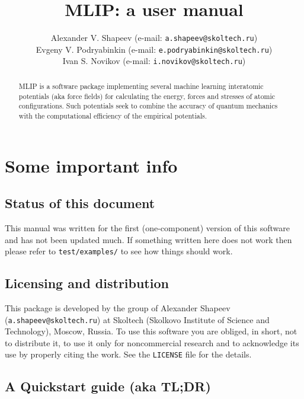 \documentclass[12pt]{article}
\author{Alexander V. Shapeev (e-mail: \texttt{a.shapeev@skoltech.ru})
\\
Evgeny V. Podryabinkin (e-mail: \texttt{e.podryabinkin@skoltech.ru})
\\
Ivan S. Novikov (e-mail: \texttt{i.novikov@skoltech.ru})
}
\title{MLIP: a user %
manual}
\renewcommand{\_}{\char`_}
\begin{document}
\sloppy

\maketitle

\begin{abstract}
	MLIP is a software package implementing several machine learning interatomic potentials (aka force fields) for calculating the energy, forces and stresses of atomic configurations.
	Such potentials seek to combine the accuracy of quantum mechanics with the computational efficiency of the empirical potentials.
\end{abstract}


\tableofcontents


\section{Some important info}
\subsection{Status of this document}	
This manual was written for the first (one-component) version of this software and has not been updated much.
If something written here does not work then please refer to \texttt{test/examples/} to see how things should work.

\subsection{Licensing and distribution}	
This package is developed by the group of Alexander Shapeev (\texttt{a.shapeev@skoltech.ru}) at Skoltech (Skolkovo Institute of Science and Technology), Moscow, Russia.
To use this software you are obliged, in short, not to distribute it, to use it only for noncommercial research and to acknowledge its use by properly citing the work.
See the \texttt{LICENSE} file for the details.

\subsection{A Quickstart guide (aka TL;DR)}
\end{document}
